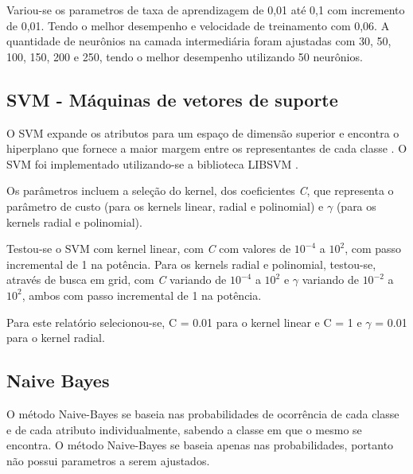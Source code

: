 Variou-se os parametros de taxa de aprendizagem de 0,01 até 0,1 com incremento de 0,01. Tendo o melhor desempenho e velocidade de treinamento com 0,06. A quantidade de neurônios na camada intermediária foram ajustadas com 30, 50, 100, 150, 200 e 250, tendo o melhor desempenho utilizando 50 neurônios.

\subsection{SVM - Máquinas de vetores de suporte}

O SVM expande os atributos para um espaço de dimensão superior e encontra o hiperplano que fornece a maior margem entre os representantes de cada classe \cite{praticalSVM}. O SVM foi implementado utilizando-se a biblioteca LIBSVM \cite{libsvm}.

Os parâmetros incluem a seleção do kernel, dos coeficientes \emph{C}, que representa o parâmetro de custo (para os kernels linear, radial e polinomial) e \(\gamma\) (para os kernels radial e polinomial).

Testou-se o SVM com kernel linear, com \emph{C} com valores de \(10^{-4}\) a \(10^2\), com passo incremental de 1 na potência. Para os kernels radial e polinomial, testou-se, através de busca em grid, com \emph{C} variando de \(10^{-4}\) a \(10^2\) e \(\gamma\) variando de \(10^{-2}\) a \(10^2\), ambos com passo incremental de 1 na potência.

Para este relatório selecionou-se, C = 0.01 para o kernel linear e C = 1 e \(\gamma\) = 0.01 para o kernel radial.

\subsection{Naive Bayes}

O método Naive-Bayes se baseia nas probabilidades de ocorrência de cada classe e de cada atributo individualmente, sabendo a classe em que o mesmo se encontra. O método Naive-Bayes se baseia apenas nas probabilidades, portanto não possui parametros a serem ajustados.